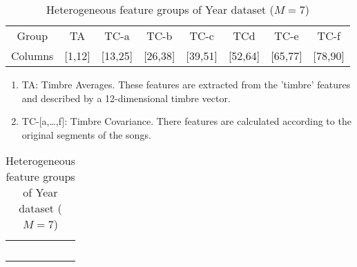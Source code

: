 \documentclass{article}
\begin{document}
\begin{table}[h]
\centering
\tiny %
\caption{Heterogeneous feature groups of Year dataset ($M=7$)} \label{Table_Year_HFGoups}
\begin{threeparttable}
\begin{tabular}{cccccccc}\hline
Group  &TA &TC-a &TC-b &TC-c &TCd &TC-e &TC-f \\
Columns &{[}1,12{]} &{[}13,25{]} &{[}26,38{]} &{[}39,51{]} &{[}52,64{]} &{[}65,77{]} &{[}78,90{]} \\ \hline
\end{tabular}
\begin{enumerate}
\item TA: Timbre Averages. These features are extracted from the 'timbre' features and described by a 12-dimensional timbre vector.                                 
\item TC-[a,\dots,f]: Timbre Covariance. There features are calculated according to the original segments of the songs.
\end{enumerate}
\end{threeparttable}
\begin{tabular}{c} \hline
~\hspace{8cm}~
\end{tabular}
\end{table}
\end{document}

